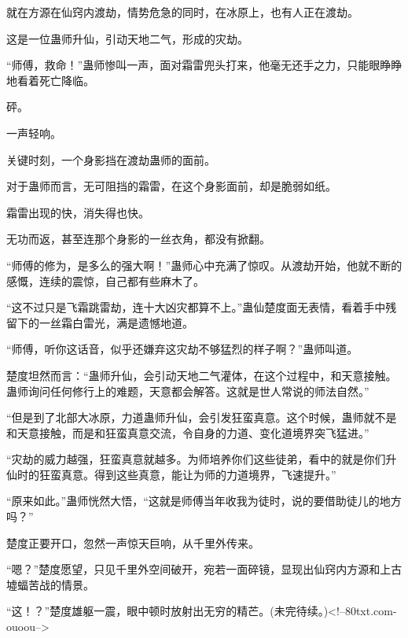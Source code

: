 \begin{this_body}
就在方源在仙窍内渡劫，情势危急的同时，在冰原上，也有人正在渡劫。

这是一位蛊师升仙，引动天地二气，形成的灾劫。

“师傅，救命！”蛊师惨叫一声，面对霜雷兜头打来，他毫无还手之力，只能眼睁睁地看着死亡降临。

砰。

一声轻响。

关键时刻，一个身影挡在渡劫蛊师的面前。

对于蛊师而言，无可阻挡的霜雷，在这个身影面前，却是脆弱如纸。

霜雷出现的快，消失得也快。

无功而返，甚至连那个身影的一丝衣角，都没有掀翻。

“师傅的修为，是多么的强大啊！”蛊师心中充满了惊叹。从渡劫开始，他就不断的感慨，连续的震惊，自己都有些麻木了。

“这不过只是飞霜跳雷劫，连十大凶灾都算不上。”蛊仙楚度面无表情，看着手中残留下的一丝霜白雷光，满是遗憾地道。

“师傅，听你这话音，似乎还嫌弃这灾劫不够猛烈的样子啊？”蛊师叫道。

楚度坦然而言：“蛊师升仙，会引动天地二气灌体，在这个过程中，和天意接触。蛊师询问任何修行上的难题，天意都会解答。这就是世人常说的师法自然。”

“但是到了北部大冰原，力道蛊师升仙，会引发狂蛮真意。这个时候，蛊师就不是和天意接触，而是和狂蛮真意交流，令自身的力道、变化道境界突飞猛进。”

“灾劫的威力越强，狂蛮真意就越多。为师培养你们这些徒弟，看中的就是你们升仙时的狂蛮真意。得到这些真意，能让为师的力道境界，飞速提升。”

“原来如此。”蛊师恍然大悟，“这就是师傅当年收我为徒时，说的要借助徒儿的地方吗？”

楚度正要开口，忽然一声惊天巨响，从千里外传来。

“嗯？”楚度愿望，只见千里外空间破开，宛若一面碎镜，显现出仙窍内方源和上古墟蝠苦战的情景。

“这！？”楚度雄躯一震，眼中顿时放射出无穷的精芒。(未完待续。)<!--80txt.com-ouoou-->

\end{this_body}

